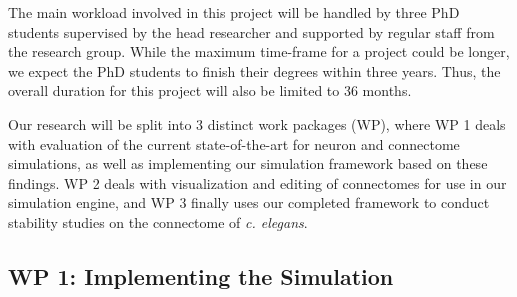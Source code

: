 \documentclass[a4paper,11pt]{article}
\begin{document}
The main workload involved in this project will be handled by three PhD students
supervised by the head researcher and supported by regular staff from the research group.
While the maximum time-frame for a project could be longer, we expect the PhD students to finish their degrees within three years. Thus, the overall duration for this project will also be limited to 36 months.

Our research will be split into 3 distinct work packages (WP), where WP 1 deals with evaluation of the current state-of-the-art for neuron and connectome simulations, as well as implementing our simulation framework based on these findings. WP 2 deals with visualization and editing of connectomes for use in our simulation engine, and WP 3 finally uses our completed framework to conduct stability studies on the connectome of \emph{c. elegans}.


\subsection{WP 1: Implementing the Simulation}





\end{document}
